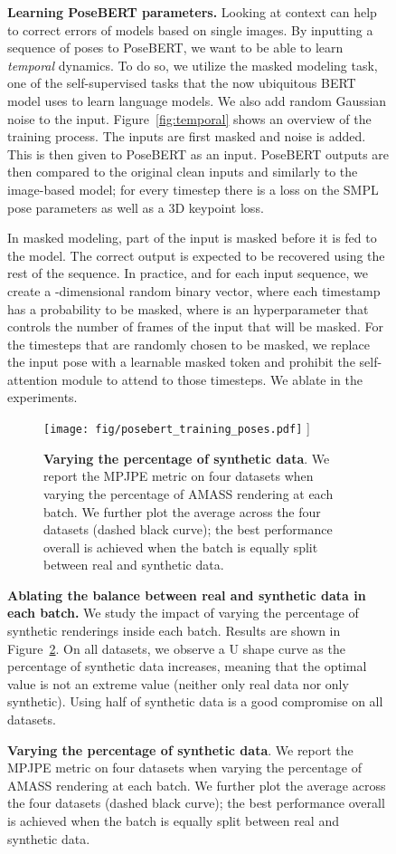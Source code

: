 \documentclass[10pt,twocolumn,letterpaper]{article}
\newcommand{\smpltransformer}{PoseBERT\xspace}
\newcommand{\poseformer}{\smpltransformer}
\renewcommand{\paragraph}[1]{\vspace{0.02cm}\noindent\textbf{#1}}
\begin{document}
\begin{figure}
\paragraph{Learning \smpltransformer parameters.}
Looking at context can help to correct errors of models based on single images. By inputting a sequence of poses to \poseformer,  we want to be able to learn \emph{temporal} dynamics. To do so, we utilize the masked modeling task, one of the self-supervised tasks that the now ubiquitous BERT~\cite{bert} model uses to learn language models. We also add random Gaussian noise to the input.
Figure~\ref{fig:temporal} shows an overview of the training process. The inputs are first masked and noise is added. This is then given to  \poseformer as an input. \poseformer outputs are then compared to the original clean inputs and similarly to the image-based model; for every timestep there is a loss on the SMPL pose parameters as well as a 3D keypoint loss.

In masked modeling, part of the input is masked before it is fed to the model. The correct output is expected to be recovered using the rest of the sequence.
In practice, and for each input sequence, we create a -dimensional random binary vector, where each timestamp has a probability  to be masked, where  is an hyperparameter that controls the number of frames of the input that will be masked.
For the  timesteps that are randomly chosen to be masked, we replace the input pose with a learnable masked token and prohibit the self-attention module to attend to those timesteps.
We ablate  in the experiments. 




\begin{figure}[t]
\centering
\texttt{[image: fig/posebert\_training\_poses.pdf]} \-0.4cm]
\vspace{-0.15cm}
\caption{\textbf{Varying the percentage of synthetic data}. We report the MPJPE metric on four datasets when varying the percentage of AMASS rendering at each batch. We further plot the  average across the four datasets (dashed black curve); the best performance overall is achieved when the batch is equally split between real and synthetic data.}
\label{fig:mocap_percentage}
\vspace{-0.6cm}
\end{figure}
 
\paragraph{Ablating the balance between real and synthetic data in each batch.} 
We study the impact of varying the percentage of synthetic renderings inside each batch. Results are shown in Figure~\ref{fig:mocap_percentage}.
On all datasets, we observe a U shape curve as the percentage of synthetic data increases, meaning that the optimal value is not an extreme value (neither only real data nor only synthetic). Using half of synthetic data is a good compromise on all datasets.
 

\end{figure}
\end{document}
